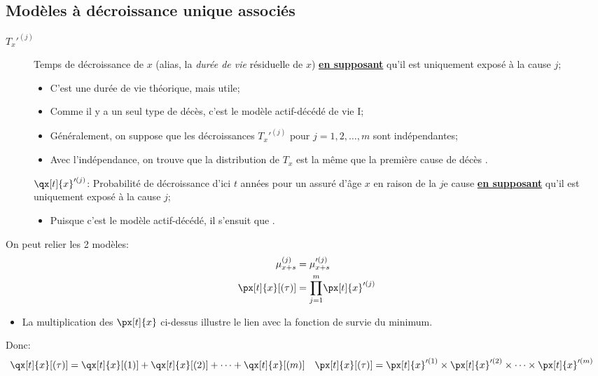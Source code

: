 \documentclass[10pt, french]{article}
\begin{document}
\begin{multicols*}{2}
\subsection*{Modèles à décroissance unique associés}
\begin{description}
	\item[$T_{x}'^{(j)}$]	Temps de décroissance de $x$ (alias, la \textit{durée de vie} résiduelle de $x$) \underline{\textbf{en supposant}} qu'il est uniquement exposé à la cause $j$;
		\begin{itemize}[leftmargin = *]
		\item	C'est une durée de vie théorique, mais utile;
		\item	Comme il y a un seul type de décès, c'est le modèle actif-décédé de vie I;
		\item	Généralement, on suppose que les décroissances $T_{x}'^{(j)}$ pour $j = 1, 2, \dots, m$ sont indépendantes;
		\item	Avec l'indépendance, on trouve que la distribution de $T_{x}$ est la même que la première cause de décès .
		\end{itemize}
	\item[]	$\qx[t]{x}'^{(j)}$:	Probabilité de décroissance d'ici $t$ années pour un assuré d'âge $x$ en raison de la $j$e cause \underline{\textbf{en supposant}} qu'il est uniquement exposé à la cause $j$;
		\begin{itemize}[leftmargin = *]
		\item	Puisque c'est le modèle actif-décédé, il s'ensuit que .
		\end{itemize}
\end{description}

On peut relier les 2 modèles:
\begin{align*}
	\mu_{x + s}^{(j)}
	&=	\mu_{x + s}'^{(j)}	\\
	\px[t]{x}[(\tau)]
	&=	\underset{j = 1}{\overset{m}{\prod}} \px[t]{x}'^{(j)}
\end{align*}
\begin{itemize}[leftmargin = *]
	\item	 La multiplication des $\px[t]{x}$ ci-dessus illustre le lien avec la fonction de survie du minimum.
\end{itemize}

Donc:
\begin{align*}
	\qx[t]{x}[(\tau)]
	&=	\qx[t]{x}[(1)]	+	\qx[t]{x}[(2)]	+	\dots	+	\qx[t]{x}[(m	)]	&
	\px[t]{x}[(\tau)]
	&=	\px[t]{x}'^{(1)}	\times	\px[t]{x}'^{(2)}	\times	\dots	\times	\px[t]{x}'^{(m)}
\end{align*}


\end{multicols*}
\end{document}
